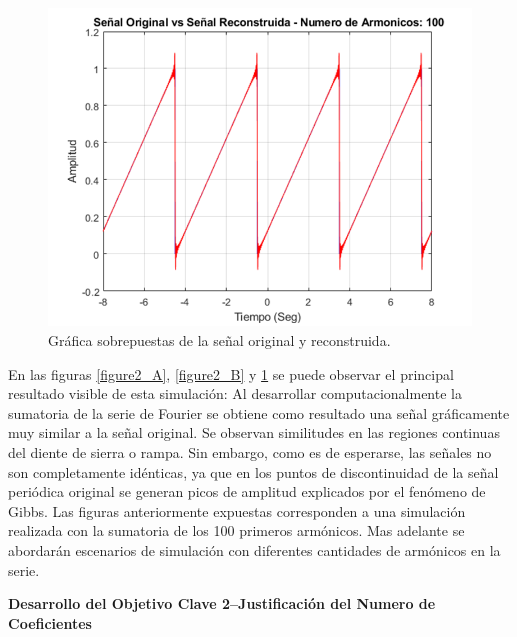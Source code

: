 \documentclass[11pt,a4paper,twocolumn]{article}
\begin{document}
    \begin{figure}[H]
        \centering
        \includegraphics[width=0.5\linewidth]{img/figure3.png}
        \caption{Gráfica sobrepuestas de la señal original y reconstruida.}
        \label{figure3}
    \end{figure}

    En las figuras \ref{figure2_A}, \ref{figure2_B} y \ref{figure3} se puede observar el principal resultado visible de esta simulación: Al 
    desarrollar computacionalmente la sumatoria de la serie de Fourier se obtiene como resultado 
    una señal gráficamente muy similar a la señal original. Se observan similitudes en las regiones 
    continuas del diente de sierra o rampa. Sin embargo, como es de esperarse, las señales no son 
    completamente idénticas, ya que en los puntos de discontinuidad de la señal periódica original se 
    generan picos de amplitud explicados por el fenómeno de Gibbs. Las figuras anteriormente 
    expuestas corresponden a una simulación realizada con la sumatoria de los 100 primeros 
    armónicos. Mas adelante se abordarán escenarios de simulación con diferentes cantidades de 
    armónicos en la serie.
    
    \textbf{Desarrollo del Objetivo Clave 2--Justificación del Numero de Coeficientes}
\end{document}
